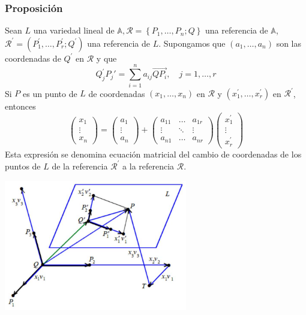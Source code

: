 \documentclass[12pt, a4paper, ones, notitlepage, openany,titlepage]{article}
\begin{document}
\subsubsection{Proposición}
Sean $L$ una variedad lineal de $\mathbb{A}, \mathcal{R}=\left\{P_{1}, \ldots, P_{n} ; Q\right\}$ una referencia de $\mathbb{A}$, $\mathcal{R}^{\prime}=\left(P_{1}^{\prime}, \ldots, P_{r}^{\prime} ; Q^{\prime}\right)$ una referencia de $L$. Supongamos que $\left(a_{1}, \ldots, a_{n}\right)$ son las coordenadas de $Q^{\prime}$ en $\mathcal{R}$ y que
$$
Q_{j}^{\prime} P_j'=\sum_{i=1}^{n} a_{i j} \overrightarrow{QP_{i}}, \quad j=1, \ldots, r
$$
\noindent Si $P$ es un punto de $L$ de coordenadas $\left(x_{1}, \ldots, x_{n}\right)$ en $\mathcal{R}$ y $\left(x_{1}^{\prime}, \ldots, x_{r}^{\prime}\right)$ en $\mathcal{R}^{\prime}$, entonces
$$
\left(\begin{array}{r}
x_{1} \\
\vdots \\
x_{n}
\end{array}\right)=\left(\begin{array}{r}
a_{1} \\
\vdots \\
a_{n}
\end{array}\right)+\left(\begin{array}{rll}
a_{11} & \ldots & a_{1 r} \\
\vdots & \ddots & \vdots \\
a_{n 1} & \ldots & a_{n r}
\end{array}\right)\left(\begin{array}{r}
x_{1}^{\prime} \\
\vdots \\
x_{r}^{\prime}
\end{array}\right)
$$
Esta expresión se denomina ecuación matricial del cambio de coordenadas de los puntos de $L$ de la referencia $\mathcal{R}^{\prime}$ a la referencia $\mathcal{R}$.

\begin{center}
\includegraphics[max width=8cm]{2023_03_01_7659aec5e35f9a9b2d3cg-14}
\end{center}
\end{document}
